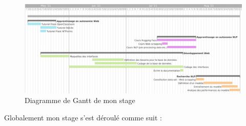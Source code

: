 \documentclass[12pt]{article}
\begin{document}
\begin{figure}
    \centering
    \includegraphics[scale=0.35]{gantt.png}
    \caption{Diagramme de Gantt de mon stage}
    \label{fig:gantt}
\end{figure}

Globalement mon stage s'est déroulé comme suit :
\end{document}
